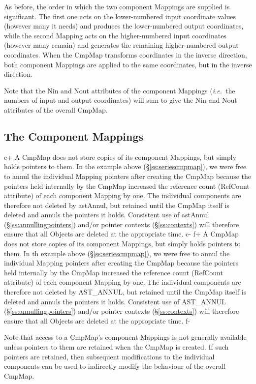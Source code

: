 \documentclass[twoside,11pt]{starlink}
\providecommand{\secref}[1]{\S\ref{#1}}
\begin{document}
As before, the order in which the two component Mappings are supplied
is significant. The first one acts on the lower-numbered input
coordinate values (however many it needs) and produces the
lower-numbered output coordinates, while the second Mapping acts on
the higher-numbered input coordinates (however many remain) and
generates the remaining higher-numbered output coordinates.  When the
CmpMap transforms coordinates in the inverse direction, both component
Mappings are applied to the same coordinates, but in the inverse
direction.

Note that the Nin and Nout attributes of the component Mappings
(\emph{i.e.}\ the numbers of input and output coordinates) will sum to
give the Nin and Nout attributes of the overall CmpMap.

\subsection{\label{ss:cmpmapcomponents}The Component Mappings}

c+
A CmpMap does not store copies of its component Mappings, but simply
holds pointers to them. In the example above
(\secref{ss:seriescmpmap}), we were free to annul the individual
Mapping pointers after creating the CmpMap because the pointers held
internally by the CmpMap increased the reference count (RefCount
attribute) of each component Mapping by one. The individual components
are therefore not deleted by astAnnul, but retained until the CmpMap
itself is deleted and annuls the pointers it holds. Consistent use of
astAnnul (\secref{ss:annullingpointers}) and/or pointer contexts
(\secref{ss:contexts}) will therefore ensure that all Objects are
deleted at the appropriate time.
c-
f+
A CmpMap does not store copies of its component Mappings, but simply
holds pointers to them. In th example above (\secref{ss:seriescmpmap}),
we were free to annul the individual Mapping pointers after creating
the CmpMap because the pointers held internally by the CmpMap
increased the reference count (RefCount attribute) of each component
Mapping by one. The individual components are therefore not deleted by
AST\_ANNUL, but retained until the CmpMap itself is deleted and annuls
the pointers it holds. Consistent use of AST\_ANNUL
(\secref{ss:annullingpointers}) and/or pointer contexts
(\secref{ss:contexts}) will therefore ensure that all Objects are
deleted at the appropriate time.
f-

Note that access to a CmpMap's component Mappings is not generally
available unless pointers to them are retained when the CmpMap is
created. If such pointers are retained, then subsequent modifications
to the individual components can be used to indirectly modify the
behaviour of the overall CmpMap.
\end{document}
